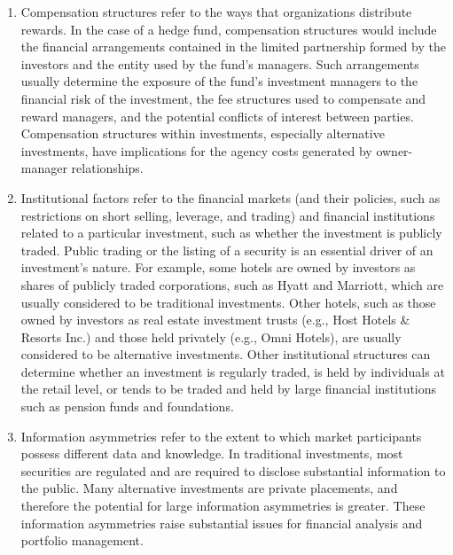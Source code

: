 \documentclass[11pt]{article}
\begin{document}
\begin{enumerate}
  \item Compensation structures refer to the ways that organizations distribute rewards. In the case of a hedge fund, compensation structures would include the financial arrangements contained in the limited partnership formed by the investors and the entity used by the fund's managers. Such arrangements usually determine the exposure of the fund's investment managers to the financial risk of the investment, the fee structures used to compensate and reward managers, and the potential conflicts of interest between parties. Compensation structures within investments, especially alternative investments, have implications for the agency costs generated by owner-manager relationships.

  \item Institutional factors refer to the financial markets (and their policies, such as restrictions on short selling, leverage, and trading) and financial institutions related to a particular investment, such as whether the investment is publicly traded. Public trading or the listing of a security is an essential driver of an investment's nature. For example, some hotels are owned by investors as shares of publicly traded corporations, such as Hyatt and Marriott, which are usually considered to be traditional investments. Other hotels, such as those owned by investors as real estate investment trusts (e.g., Host Hotels \& Resorts Inc.) and those held privately (e.g., Omni Hotels), are usually considered to be alternative investments. Other institutional structures can determine whether an investment is regularly traded, is held by individuals at the retail level, or tends to be traded and held by large financial institutions such as pension funds and foundations.

  \item Information asymmetries refer to the extent to which market participants possess different data and knowledge. In traditional investments, most securities are regulated and are required to disclose substantial information to the public. Many alternative investments are private placements, and therefore the potential for large information asymmetries is greater. These information asymmetries raise substantial issues for financial analysis and portfolio management.


\end{enumerate}
\end{document}
